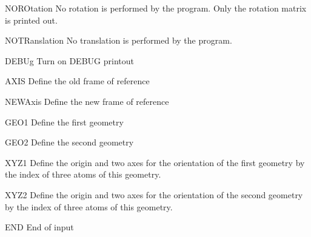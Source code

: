 \begin{keywordlist}
\item[NOROtation]
No rotation is performed by the program.
Only the rotation matrix is printed out.
\item[NOTRanslation]
No translation is performed by the program.
\item[DEBUg]
Turn on DEBUG printout
\item[AXIS]
Define the old frame of reference
\item[NEWAxis]
Define the new frame of reference
\item[GEO1]
Define the first geometry
\item[GEO2]
Define the second geometry
\item[XYZ1]
Define the origin and two axes for the orientation of the first geometry by
the index of three atoms of this geometry.
\item[XYZ2]
Define the origin and two axes for the orientation of the second geometry by
the index of three atoms of this geometry.
\item[END]
End of input

\end{keywordlist}

